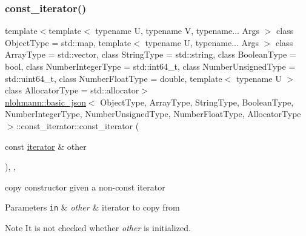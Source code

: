 \subsubsection{\texorpdfstring{const\+\_\+iterator()}{const\_iterator()}\hspace{0.1cm}{\footnotesize\ttfamily [2/3]}}
{\footnotesize\ttfamily template$<$template$<$ typename U, typename V, typename... Args $>$ class Object\+Type = std\+::map, template$<$ typename U, typename... Args $>$ class Array\+Type = std\+::vector, class String\+Type  = std\+::string, class Boolean\+Type  = bool, class Number\+Integer\+Type  = std\+::int64\+\_\+t, class Number\+Unsigned\+Type  = std\+::uint64\+\_\+t, class Number\+Float\+Type  = double, template$<$ typename U $>$ class Allocator\+Type = std\+::allocator$>$ \\
\hyperlink{classnlohmann_1_1basic__json}{nlohmann\+::basic\+\_\+json}$<$ Object\+Type, Array\+Type, String\+Type, Boolean\+Type, Number\+Integer\+Type, Number\+Unsigned\+Type, Number\+Float\+Type, Allocator\+Type $>$\+::const\+\_\+iterator\+::const\+\_\+iterator (\begin{DoxyParamCaption}\item[{const \hyperlink{classnlohmann_1_1basic__json_1_1iterator}{iterator} \&}]{other }\end{DoxyParamCaption})\hspace{0.3cm}{\ttfamily [inline]}, {\ttfamily [explicit]}, {\ttfamily [noexcept]}}



copy constructor given a non-\/const iterator 


\begin{DoxyParams}[1]{Parameters}
\mbox{\tt in}  & {\em other} & iterator to copy from \\
\hline
\end{DoxyParams}
\begin{DoxyNote}{Note}
It is not checked whether {\itshape other} is initialized. 
\end{DoxyNote}
\hypertarget{classnlohmann_1_1basic__json_1_1const__iterator_a18c35a6735d3da96b4fc026421c05dd8}{}\label{classnlohmann_1_1basic__json_1_1const__iterator_a18c35a6735d3da96b4fc026421c05dd8} 
